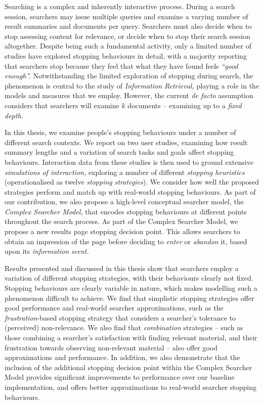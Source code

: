 
\begin{preamble}
{}

Searching is a complex and inherently interactive process. During a search session, searchers may issue multiple queries and examine a varying number of result summaries and documents per query. Searchers must also decide when to stop assessing content for relevance, or decide when to stop their search session altogether. Despite being such a fundamental activity, only a limited number of studies have explored stopping behaviours in detail, with a majority reporting that searchers stop because they feel that what they have found feels \emph{``good enough''.} Notwithstanding the limited exploration of stopping during search, the phenomenon is central to the study of \emph{Information Retrieval,} playing a role in the models and measures that we employ. However, the current \emph{de facto} assumption considers that searchers will examine $k$ documents -- examining up to a \emph{fixed depth.}

In this thesis, we examine people's stopping behaviours under a number of different search contexts. We report on two user studies, examining how result summary lengths and a variation of search tasks and goals affect stopping behaviours. Interaction data from these studies is then used to ground extensive \emph{simulations of interaction,}  exploring a number of different \emph{stopping heuristics} (operationalised as twelve \emph{stopping strategies}). We consider how well the proposed strategies perform and match up with real-world stopping behaviours. As part of our contribution, we also propose a high-level conceptual searcher model, the \emph{Complex Searcher Model,} that encodes stopping behaviours at different points throughout the search process. As part of the Complex Searcher Model, we propose a new results page stopping decision point. This allows searchers to obtain an impression of the page before deciding to \emph{enter} or \emph{abandon} it, based upon its \emph{information scent.}

Results presented and discussed in this thesis show that searchers employ a variation of different stopping strategies, with their behaviours clearly not fixed. Stopping behaviours are clearly variable in nature, which makes modelling such a phenomenon difficult to achieve. We find that simplistic stopping strategies offer good performance and real-world searcher approximations, such as the \emph{frustration}-based stopping strategy that considers a searcher's tolerance to (perceived) non-relevance. We also find that \emph{combination} strategies -- such as those combining a searcher's satisfaction with finding relevant material, and their frustration towards observing non-relevant material -- also offer good approximations and performance. In addition, we also demonstrate that the inclusion of the additional stopping decision point within the Complex Searcher Model provides significant improvements to performance over our baseline implementation, and offers better approximations to real-world searcher stopping behaviours.


\end{preamble}
